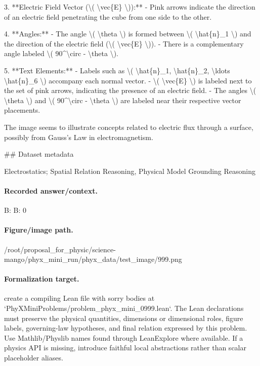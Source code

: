 3. **Electric Field Vector (\textbackslash{}( \textbackslash{}vec\{E\} \textbackslash{})):**
   - Pink arrows indicate the direction of an electric field penetrating the cube from one side to the other.

4. **Angles:**
   - The angle \textbackslash{}( \textbackslash{}theta \textbackslash{}) is formed between \textbackslash{}( \textbackslash{}hat\{n\}\_1 \textbackslash{}) and the direction of the electric field (\textbackslash{}( \textbackslash{}vec\{E\} \textbackslash{})).
   - There is a complementary angle labeled \textbackslash{}( 90\textasciicircum{}\textbackslash{}circ - \textbackslash{}theta \textbackslash{}).

5. **Text Elements:**
   - Labels such as \textbackslash{}( \textbackslash{}hat\{n\}\_1, \textbackslash{}hat\{n\}\_2, \textbackslash{}ldots \textbackslash{}hat\{n\}\_6 \textbackslash{}) accompany each normal vector.
   - \textbackslash{}( \textbackslash{}vec\{E\} \textbackslash{}) is labeled next to the set of pink arrows, indicating the presence of an electric field.
   - The angles \textbackslash{}( \textbackslash{}theta \textbackslash{}) and \textbackslash{}( 90\textasciicircum{}\textbackslash{}circ - \textbackslash{}theta \textbackslash{}) are labeled near their respective vector placements.

The image seems to illustrate concepts related to electric flux through a surface, possibly from Gauss's Law in electromagnetism.

\#\# Dataset metadata

Electrostatics; Spatial Relation Reasoning, Physical Model Grounding Reasoning

\paragraph{Recorded answer/context.}
B: B: 0

\paragraph{Figure/image path.}
/root/proposal\_for\_physic/science-mango/phyx\_mini\_run/phyx\_data/test\_image/999.png

\paragraph{Formalization target.}
create a compiling Lean file with sorry bodies at `PhyXMiniProblems/problem\_phyx\_mini\_0999.lean`. The Lean declarations must preserve the physical quantities, dimensions or dimensional roles, figure labels, governing-law hypotheses, and final relation expressed by this problem.
Use Mathlib/Physlib names found through LeanExplore where available. If a physics API is missing, introduce faithful local abstractions rather than scalar placeholder aliases.

